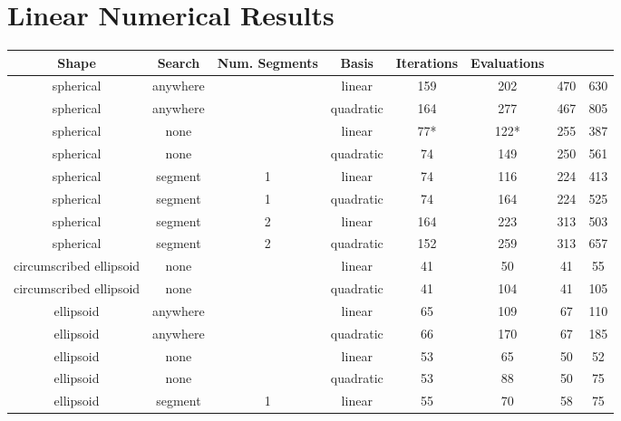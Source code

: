 \appendix


\chapter{Linear Numerical Results}

\tiny
\begin{center}
\begin{longtable}{ c c c c c c c c }
\label{linear_pathological_results}
Shape & Search & Num. Segments & Basis & Iterations & Evaluations \\
\hline
                spherical &   anywhere &       &     linear & 159  &   202  &  470 &  630 \\
                spherical &   anywhere &       &  quadratic & 164  &   277  &  467 &  805 \\
                spherical &       none &       &     linear &  77* &   122* &  255 &  387 \\
                spherical &       none &       &  quadratic &  74  &   149  &  250 &  561 \\
                spherical &    segment &     1 &     linear &  74  &   116  &  224 &  413 \\
                spherical &    segment &     1 &  quadratic &  74  &   164  &  224 &  525 \\
                spherical &    segment &     2 &     linear & 164  &   223  &  313 &  503 \\
                spherical &    segment &     2 &  quadratic & 152  &   259  &  313 &  657 \\
  circumscribed ellipsoid &       none &       &     linear &  41  &    50  &   41 &   55 \\
  circumscribed ellipsoid &       none &       &  quadratic &  41  &   104  &   41 &  105 \\
                ellipsoid &   anywhere &       &     linear &  65  &   109  &   67 &  110 \\
                ellipsoid &   anywhere &       &  quadratic &  66  &   170  &   67 &  185 \\
                ellipsoid &       none &       &     linear &  53  &    65  &   50 &   52 \\
                ellipsoid &       none &       &  quadratic &  53  &    88  &   50 &   75 \\
                ellipsoid &    segment &     1 &     linear &  55  &    70  &   58 &   75 \\

\end{longtable}
\end{center}
